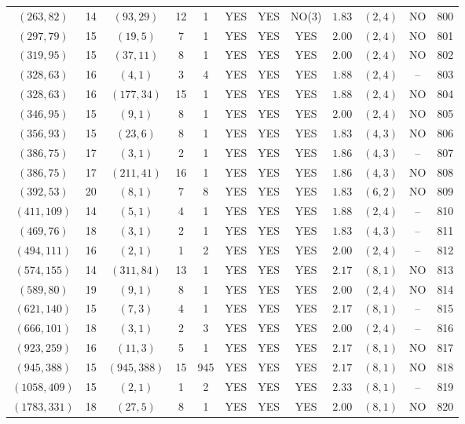 \begin{longtable}{|c|c|c|c|c|c|c|c|c|c|c|c|}
$(263,82)$ & 14 & $(93,29)$ & 12 & 1 & YES & YES & NO(3) & $1.83$ & $(2,4)$ & NO & 800\\
$(297,79)$ & 15 & $(19,5)$ & 7 & 1 & YES & YES & YES & $2.00$ & $(2,4)$ & NO & 801\\
$(319,95)$ & 15 & $(37,11)$ & 8 & 1 & YES & YES & YES & $2.00$ & $(2,4)$ & NO & 802\\
$(328,63)$ & 16 & $(4,1)$ & 3 & 4 & YES & YES & YES & $1.88$ & $(2,4)$ & -- & 803\\
$(328,63)$ & 16 & $(177,34)$ & 15 & 1 & YES & YES & YES & $1.88$ & $(2,4)$ & NO & 804\\
$(346,95)$ & 15 & $(9,1)$ & 8 & 1 & YES & YES & YES & $2.00$ & $(2,4)$ & NO & 805\\
$(356,93)$ & 15 & $(23,6)$ & 8 & 1 & YES & YES & YES & $1.83$ & $(4,3)$ & NO & 806\\
$(386,75)$ & 17 & $(3,1)$ & 2 & 1 & YES & YES & YES & $1.86$ & $(4,3)$ & -- & 807\\
$(386,75)$ & 17 & $(211,41)$ & 16 & 1 & YES & YES & YES & $1.86$ & $(4,3)$ & NO & 808\\
$(392,53)$ & 20 & $(8,1)$ & 7 & 8 & YES & YES & YES & $1.83$ & $(6,2)$ & NO & 809\\
$(411,109)$ & 14 & $(5,1)$ & 4 & 1 & YES & YES & YES & $1.88$ & $(2,4)$ & -- & 810\\
$(469,76)$ & 18 & $(3,1)$ & 2 & 1 & YES & YES & YES & $1.83$ & $(4,3)$ & -- & 811\\
$(494,111)$ & 16 & $(2,1)$ & 1 & 2 & YES & YES & YES & $2.00$ & $(2,4)$ & -- & 812\\
$(574,155)$ & 14 & $(311,84)$ & 13 & 1 & YES & YES & YES & $2.17$ & $(8,1)$ & NO & 813\\
$(589,80)$ & 19 & $(9,1)$ & 8 & 1 & YES & YES & YES & $2.00$ & $(2,4)$ & NO & 814\\
$(621,140)$ & 15 & $(7,3)$ & 4 & 1 & YES & YES & YES & $2.17$ & $(8,1)$ & -- & 815\\
$(666,101)$ & 18 & $(3,1)$ & 2 & 3 & YES & YES & YES & $2.00$ & $(2,4)$ & -- & 816\\
$(923,259)$ & 16 & $(11,3)$ & 5 & 1 & YES & YES & YES & $2.17$ & $(8,1)$ & NO & 817\\
$(945,388)$ & 15 & $(945,388)$ & 15 & 945 & YES & YES & YES & $2.17$ & $(8,1)$ & NO & 818\\
$(1058,409)$ & 15 & $(2,1)$ & 1 & 2 & YES & YES & YES & $2.33$ & $(8,1)$ & -- & 819\\
$(1783,331)$ & 18 & $(27,5)$ & 8 & 1 & YES & YES & YES & $2.00$ & $(8,1)$ & NO & 820\\

\end{longtable}
